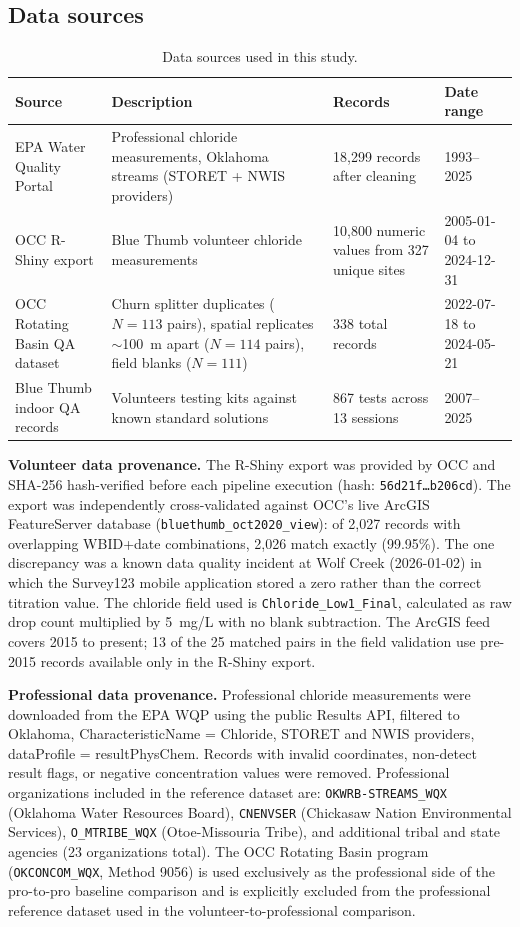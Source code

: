 \documentclass[lineno]{wlpeerj}
\begin{document}
\subsection{Data sources}

\begin{table}[ht]
\centering
\caption{Data sources used in this study.}
\label{tab:datasources}
\begin{tabular}{p{3.5cm} p{5cm} p{2.5cm} p{2.5cm}}
\toprule
Source & Description & Records & Date range \\
\midrule
EPA Water Quality Portal & Professional chloride measurements, Oklahoma streams (STORET + NWIS providers) & 18,299 records after cleaning & 1993--2025 \\
OCC R-Shiny export & Blue Thumb volunteer chloride measurements & 10,800 numeric values from 327 unique sites & 2005-01-04 to 2024-12-31 \\
OCC Rotating Basin QA dataset & Churn splitter duplicates ($N=113$ pairs), spatial replicates $\sim$100~m apart ($N=114$ pairs), field blanks ($N=111$) & 338 total records & 2022-07-18 to 2024-05-21 \\
Blue Thumb indoor QA records & Volunteers testing kits against known standard solutions & 867 tests across 13 sessions & 2007--2025 \\
\bottomrule
\end{tabular}
\end{table}

\textbf{Volunteer data provenance.} The R-Shiny export was provided by OCC and SHA-256 hash-verified before each pipeline execution (hash: \texttt{56d21f\ldots b206cd}). The export was independently cross-validated against OCC's live ArcGIS FeatureServer database (\texttt{bluethumb\_oct2020\_view}): of 2,027 records with overlapping WBID+date combinations, 2,026 match exactly (99.95\%). The one discrepancy was a known data quality incident at Wolf Creek (2026-01-02) in which the Survey123 mobile application stored a zero rather than the correct titration value. The chloride field used is \texttt{Chloride\_Low1\_Final}, calculated as raw drop count multiplied by 5~mg/L with no blank subtraction. The ArcGIS feed covers 2015 to present; 13 of the 25 matched pairs in the field validation use pre-2015 records available only in the R-Shiny export.

\textbf{Professional data provenance.} Professional chloride measurements were downloaded from the EPA WQP using the public Results API, filtered to Oklahoma, CharacteristicName = Chloride, STORET and NWIS providers, dataProfile = resultPhysChem. Records with invalid coordinates, non-detect result flags, or negative concentration values were removed. Professional organizations included in the reference dataset are: \texttt{OKWRB-STREAMS\_WQX} (Oklahoma Water Resources Board), \texttt{CNENVSER} (Chickasaw Nation Environmental Services), \texttt{O\_MTRIBE\_WQX} (Otoe-Missouria Tribe), and additional tribal and state agencies (23 organizations total). The OCC Rotating Basin program (\texttt{OKCONCOM\_WQX}, Method 9056) is used exclusively as the professional side of the pro-to-pro baseline comparison and is explicitly excluded from the professional reference dataset used in the volunteer-to-professional comparison.
\end{document}
